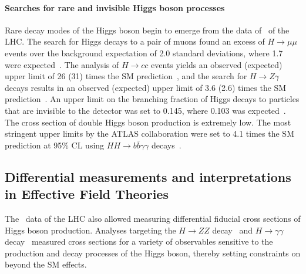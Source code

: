\paragraph{Searches for rare and invisible Higgs boson processes}
Rare decay modes of the Higgs boson begin to emerge from the data of \RunTwo\ of the LHC. 
The search for Higgs decays to a pair of muons found an excess of $H \to \mu\mu$ events over the background expectation of 2.0 standard deviations, where 1.7 were expected~\cite{HIGG-2019-14}.
The analysis of $H \to cc$ events yields an observed (expected) upper limit of 26 (31) times the SM prediction~\cite{ATLAS-CONF-2021-021}, and the search for $H \to Z\gamma$ decays results in an observed (expected) upper limit of 3.6 (2.6) times the SM prediction~\cite{HIGG-2018-42}.
An upper limit on the branching fraction of Higgs decays to particles that are invisible to the detector was set to 0.145, where 0.103 was expected~\cite{ATLASInvisible1}.
The cross section of double Higgs boson production is extremely low. The most stringent upper limits by the ATLAS collaboration were set to 4.1 times the SM prediction at 95\% CL using $HH \to b\bar{b}\gamma\gamma$ decays~\cite{ATLAS-CONF-2021-016}.

\subsection{Differential measurements and interpretations in Effective Field Theories}
The \RunTwo\ data of the LHC also allowed measuring differential fiducial cross sections of Higgs boson production. Analyses targeting the $H \to ZZ$ decay~\cite{ATLAS:2020wny} and $H \to \gamma\gamma$ decay~\cite{hgammagammaDiff} measured cross sections for a variety of observables sensitive to the production and decay processes of the Higgs boson, thereby setting constraints on beyond the SM effects.

